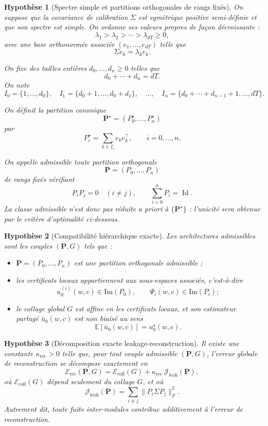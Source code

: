 \documentclass[11pt,a4paper]{article}
\newtheorem{assumption}{Hypothèse}[section]
\DeclareMathOperator{\Id}{Id}
\newcommand{\1}{\mathbf 1}
\begin{document}
\begin{assumption}[Spectre simple et partitions orthogonales de rangs fixés]
On suppose que la covariance de calibration \(\Sigma\) est symétrique positive semi-définie
et que son spectre est simple.
On ordonne ses valeurs propres de façon décroissante :
\[
\lambda_1>\lambda_2>\cdots>\lambda_{dT}\ge 0,
\]
avec une base orthonormée associée \((e_1,\dots,e_{dT})\) telle que
\[
\Sigma e_k=\lambda_k e_k.
\]

On fixe des tailles entières \(d_0,\dots,d_n\ge 0\) telles que
\[
d_0+\cdots+d_n=dT.
\]
On note
\[
I_0=\{1,\dots,d_0\},\quad
I_1=\{d_0+1,\dots,d_0+d_1\},\quad \dots,\quad
I_n=\{d_0+\cdots+d_{n-1}+1,\dots,dT\}.
\]

On définit la partition canonique
\[
\mathbf P^\star=(P_0^\star,\dots,P_n^\star)
\]
par
\[
P_i^\star=\sum_{k\in I_i} e_ke_k^\top,
\qquad i=0,\dots,n.
\]

On appelle \emph{admissible} toute partition orthogonale
\[
\mathbf P=(P_0,\dots,P_n)
\]
de rangs fixés vérifiant
\[
P_iP_j=0\quad(i\neq j),
\qquad
\sum_{i=0}^n P_i=\Id.
\]
La classe admissible n'est donc pas réduite a priori à \(\{\mathbf P^\star\}\) :
l'unicité sera obtenue par le critère d'optimalité ci-dessous.
\end{assumption}

\begin{assumption}[Compatibilité hiérarchique exacte]
Les architectures admissibles sont les couples \((\mathbf P,G)\) tels que :

\begin{itemize}[leftmargin=2em]
    \item \(\mathbf P=(P_0,\dots,P_n)\) est une partition orthogonale admissible ;
    \item les certificats locaux appartiennent aux sous-espaces associés, c'est-à-dire
    \[
    u_0^{(i)}(w,c)\in \mathrm{Im}(P_0),
    \qquad
    \Psi_i(w,c)\in \mathrm{Im}(P_i);
    \]
    \item le collage global \(G\) est affine en les certificats locaux, et son estimateur partagé
    \(\bar u_0(w,c)\) est non biaisé au sens
    \[
    \mathbb E[\bar u_0(w,c)]=u_0^\star(w,c).
    \]
\end{itemize}
\end{assumption}

\begin{assumption}[Décomposition exacte leakage-reconstruction]
Il existe une constante \(\kappa_{\mathrm{rec}}>0\) telle que, pour tout couple admissible \((\mathbf P,G)\),
l'erreur globale de reconstruction se décompose exactement en
\[
\mathcal E_{\mathrm{rec}}(\mathbf P,G)
=
\mathcal E_{\mathrm{coll}}(G)
+
\kappa_{\mathrm{rec}}\,\mathcal J_{\mathrm{leak}}(\mathbf P),
\]
où \(\mathcal E_{\mathrm{coll}}(G)\) dépend seulement du collage \(G\), et où
\[
\mathcal J_{\mathrm{leak}}(\mathbf P)
=
\sum_{i\neq j}\|P_i\Sigma P_j\|_F^2.
\]
Autrement dit, toute fuite inter-modules contribue additivement à l'erreur de reconstruction.
\end{assumption}
\end{document}

